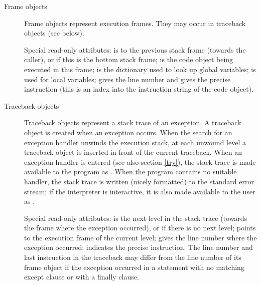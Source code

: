 \begin{description}
\begin{description}
\item[Frame objects]
Frame objects represent execution frames.  They may occur in traceback
objects (see below).

Special read-only attributes:  is to the previous
stack frame (towards the caller), or  if this is the bottom
stack frame;  is the code object being executed in this
frame;  is the dictionary used to look up global
variables;  is used for local variables;
 gives the line number and  gives the
precise instruction (this is an index into the instruction string of
the code object).

\item[Traceback objects] \label{traceback}
Traceback objects represent a stack trace of an exception.  A
traceback object is created when an exception occurs.  When the search
for an exception handler unwinds the execution stack, at each unwound
level a traceback object is inserted in front of the current
traceback.  When an exception handler is entered
(see also section \ref{try}), the stack trace is
made available to the program as .  When the
program contains no suitable handler, the stack trace is written
(nicely formatted) to the standard error stream; if the interpreter is
interactive, it is also made available to the user as
.

Special read-only attributes:  is the next level in the
stack trace (towards the frame where the exception occurred), or
 if there is no next level;  points to the
execution frame of the current level;  gives the line
number where the exception occurred;  indicates the
precise instruction.  The line number and last instruction in the
traceback may differ from the line number of its frame object if the
exception occurred in a  statement with no matching
except clause or with a finally clause.

\end{description} %

\end{description} %


